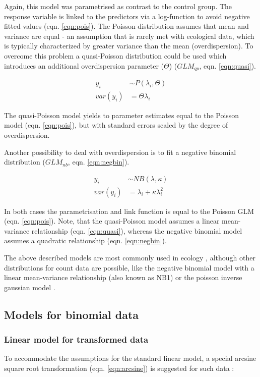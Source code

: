 \documentclass[twocolumn, natbib]{svjour3}
\begin{document}
Again, this model was parametrised as contrast to the control group. 
The response variable is linked to the predictors via a log-function to avoid negative fitted values (eqn. \ref{eqn:pois}). 
The Poisson distribution assumes that mean and variance are equal - an assumption that is rarely met with ecological data, which is typically characterized by greater variance than the mean (overdispersion).
To overcome this problem a quasi-Poisson distribution could be used which introduces an additional overdispersion parameter ($\Theta$) ($GLM_{qp}$, eqn. \ref{eqn:quasi}).

\begin{align}
  y_i &\sim P(\lambda_i, \Theta) \label{eqn:quasi} \\
  var(y_i) &= \Theta \lambda_i  \nonumber
\end{align}

The quasi-Poisson model yields to parameter estimates equal to the Poisson model (eqn. \ref{eqn:pois}), but with standard errors scaled by the degree of overdispersion.

Another possibility to deal with overdispersion is to fit a negative binomial distribution ($GLM_{nb}$, eqn. \ref{eqn:negbin}).

\begin{align}
  y_i &\sim NB(\lambda, \kappa) \label{eqn:negbin}  \\
  var(y_i) &= \lambda_i + \kappa \lambda_i^2 \nonumber
\end{align}

In both cases the parametrisation and link function is equal to the Poisson GLM (eqn. \ref{eqn:pois}).
Note, that the quasi-Poisson model assumes a linear mean-variance relationship (eqn. \ref{eqn:quasi}), whereas the negative binomial model assumes a quadratic relationship (eqn. \ref{eqn:negbin}).

The above described models are most commonly used in ecology \citep{ver_hoef_quasi-poisson_2007}, although other distributions for count data are possible, like the negative binomial model with a linear mean-variance relationship (also known as NB1) or the poisson inverse gaussian model \citep{hilbe_modeling_2014}.


\subsection{Models for binomial data}
\subsubsection{Linear model for transformed data}
To accommodate the assumptions for the standard linear model, a special arcsine square root transformation (eqn. \ref{eqn:arcsine}) is suggested for such  data \citep{epa_methods_2002,newman_quantitative_2012}:
\end{document}
